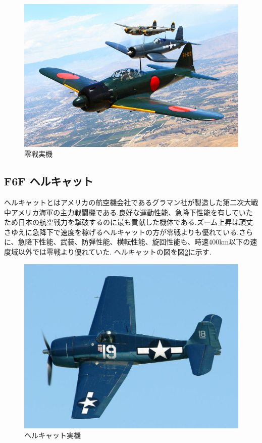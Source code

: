 \begin{figure}[htbp]
  \begin{center}
    \includegraphics[width=140mm]{reisen.JPG}
    \end{center}
  \caption{零戦実機}
 \label{fig:reisen}
\end{figure}

\subsection{F6F ヘルキャット}
ヘルキャットとはアメリカの航空機会社であるグラマン社が製造した第二次大戦中アメリカ海軍の主力戦闘機である.良好な運動性能、急降下性能を有していたため日本の航空戦力を撃破するのに最も貢献した機体である.ズーム上昇は頑丈さゆえに急降下で速度を稼げるヘルキャットの方が零戦よりも優れている.さらに、急降下性能、武装、防弾性能、横転性能、旋回性能も、時速400km以下の速度域以外では零戦より優れていた.
ヘルキャットの図を図\ref{fig:F6F}に示す.

\begin{figure}[htbp]
  \begin{center}
    \includegraphics[width=140mm]{F6F.JPG}
    \end{center}
  \caption{ヘルキャット実機}
 \label{fig:F6F}
\end{figure}

